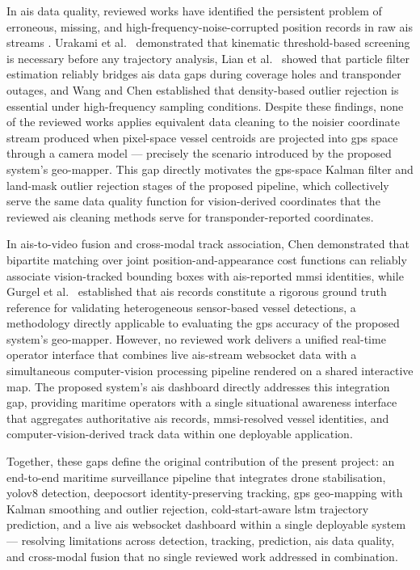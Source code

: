 In \gls{ais} data quality, reviewed works have identified the persistent problem of
erroneous, missing, and high-frequency-noise-corrupted position records in raw
\gls{ais} streams \cite{Urakami2018, Lian2019, Wang2024a}. Urakami et al.\
\cite{Urakami2018} demonstrated that kinematic threshold-based screening is
necessary before any trajectory analysis, Lian et al.\ \cite{Lian2019} showed
that particle filter estimation reliably bridges \gls{ais} data gaps during coverage
holes and transponder outages, and Wang and Chen \cite{Wang2024a} established
that density-based outlier rejection is essential under high-frequency sampling
conditions. Despite these findings, none of the reviewed works applies equivalent
data cleaning to the noisier coordinate stream produced when pixel-space vessel
centroids are projected into \gls{gps} space through a camera model --- precisely the
scenario introduced by the proposed system's geo-mapper. This gap directly
motivates the \gls{gps}-space Kalman filter and land-mask outlier rejection stages
of the proposed pipeline, which collectively serve the same data quality function
for vision-derived coordinates that the reviewed \gls{ais} cleaning methods serve for
transponder-reported coordinates.

In \gls{ais}-to-video fusion and cross-modal track association, Chen \cite{Chen2023a}
demonstrated that bipartite matching over joint position-and-appearance cost
functions can reliably associate vision-tracked bounding boxes with \gls{ais}-reported
\gls{mmsi} identities, while Gurgel et al.\ \cite{Gurgel2010} established that \gls{ais}
records constitute a rigorous ground truth reference for validating heterogeneous
sensor-based vessel detections, a methodology directly applicable to evaluating
the \gls{gps} accuracy of the proposed system's geo-mapper. However, no reviewed work
delivers a unified real-time operator interface that combines live \gls{ais}-stream
\gls{websocket} data with a simultaneous computer-vision processing pipeline rendered
on a shared interactive map. The proposed system's \gls{ais} dashboard directly
addresses this integration gap, providing maritime operators with a single
situational awareness interface that aggregates authoritative \gls{ais} records,
\gls{mmsi}-resolved vessel identities, and computer-vision-derived track data within
one deployable application.

Together, these gaps define the original contribution of the present project:
an end-to-end maritime surveillance pipeline that integrates drone stabilisation,
\gls{yolov8} detection, \gls{deepocsort} identity-preserving tracking, \gls{gps} geo-mapping with
Kalman smoothing and outlier rejection, cold-start-aware \gls{lstm} trajectory
prediction, and a live \gls{ais} \gls{websocket} dashboard within a single deployable system
--- resolving limitations across detection, tracking, prediction, \gls{ais} data
quality, and cross-modal fusion that no single reviewed work addressed in
combination.

